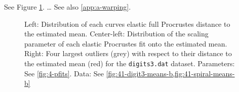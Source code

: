 
%

See Figure \cref{fig:4-outliers}. \dots {} See also \cref{app:a-warping}.
\begin{figure}
  \centering
  \begin{subfigure}{0.24\textwidth}
  \end{subfigure}
  \begin{subfigure}{0.24\textwidth}
  \end{subfigure}
  \begin{subfigure}{0.48\textwidth}
    \centering
  \end{subfigure}
  \caption{Left: Distribution of each curves elastic full Procrustes distance to the estimated mean.
  Center-left: Distribution of the scaling parameter of each elastic Procrustes fit onto the estimated mean.
  Right: Four largest outliers (grey) with respect to their distance to the estimated mean (red) for the \texttt{digits3.dat} dataset.
  Parameters: See \cref{fig:4-pfits}. 
  Data: See \cref{fig:41-digit3-means-b,fig:41-spiral-means-b}}
  \label{fig:4-outliers}
\end{figure}


